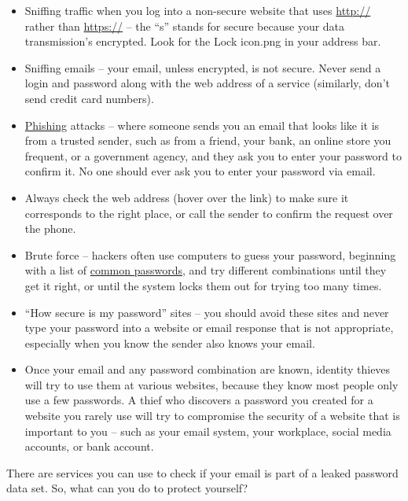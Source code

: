\documentclass[
]{book}
\providecommand{\tightlist}{%
  \setlength{\itemsep}{0pt}\setlength{\parskip}{0pt}}
\theoremstyle{definition}
\theoremstyle{definition}
\theoremstyle{definition}
\theoremstyle{definition}
\theoremstyle{remark}
\begin{document}
\begin{itemize}
\tightlist
\item
  Sniffing traffic when you log into a non-secure website that uses \url{http://} rather than \url{https://} -- the ``s'' stands for secure because your data transmission's encrypted. Look for the Lock icon.png in your address bar.\\
\item
  Sniffing emails -- your email, unless encrypted, is not secure. Never send a login and password along with the web address of a service (similarly, don't send credit card numbers).\\
\item
  \href{https://en.wikipedia.org/wiki/Phishing}{Phishing} attacks -- where someone sends you an email that looks like it is from a trusted sender, such as from a friend, your bank, an online store you frequent, or a government agency, and they ask you to enter your password to confirm it. No one should ever ask you to enter your password via email.\\
\item
  Always check the web address (hover over the link) to make sure it corresponds to the right place, or call the sender to confirm the request over the phone.\\
\item
  Brute force -- hackers often use computers to guess your password, beginning with a list of \href{https://www.passwordrandom.com/most-popular-passwords}{common passwords}, and try different combinations until they get it right, or until the system locks them out for trying too many times.\\
\item
  ``How secure is my password'' sites -- you should avoid these sites and never type your password into a website or email response that is not appropriate, especially when you know the sender also knows your email.\\
\item
  Once your email and any password combination are known, identity thieves will try to use them at various websites, because they know most people only use a few passwords. A thief who discovers a password you created for a website you rarely use will try to compromise the security of a website that is important to you -- such as your email system, your workplace, social media accounts, or bank account.
\end{itemize}

There are services you can use to check if your email is part of a leaked password data set. So, what can you do to protect yourself?
\end{document}
